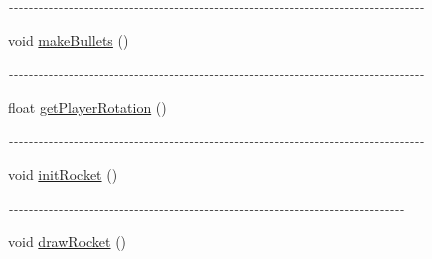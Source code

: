 \begin{DoxyCompactItemize}
\begin{DoxyCompactList}\small\item\em -\/-\/-\/-\/-\/-\/-\/-\/-\/-\/-\/-\/-\/-\/-\/-\/-\/-\/-\/-\/-\/-\/-\/-\/-\/-\/-\/-\/-\/-\/-\/-\/-\/-\/-\/-\/-\/-\/-\/-\/-\/-\/-\/-\/-\/-\/-\/-\/-\/-\/-\/-\/-\/-\/-\/-\/-\/-\/-\/-\/-\/-\/-\/-\/-\/-\/-\/-\/-\/-\/-\/-\/-\/-\/-\/-\/-\/-\/-\/-\/-\/-\/-\/ \item\end{DoxyCompactList}\item 
\hypertarget{classWorld_a5ca7c2b1e57adbecf26e52340687a6e6}{
void \hyperlink{classWorld_a5ca7c2b1e57adbecf26e52340687a6e6}{makeBullets} ()}
\label{classWorld_a5ca7c2b1e57adbecf26e52340687a6e6}

\begin{DoxyCompactList}\small\item\em -\/-\/-\/-\/-\/-\/-\/-\/-\/-\/-\/-\/-\/-\/-\/-\/-\/-\/-\/-\/-\/-\/-\/-\/-\/-\/-\/-\/-\/-\/-\/-\/-\/-\/-\/-\/-\/-\/-\/-\/-\/-\/-\/-\/-\/-\/-\/-\/-\/-\/-\/-\/-\/-\/-\/-\/-\/-\/-\/-\/-\/-\/-\/-\/-\/-\/-\/-\/-\/-\/-\/-\/-\/-\/-\/-\/-\/-\/-\/-\/-\/-\/-\/ \item\end{DoxyCompactList}\item 
\hypertarget{classWorld_a343c6d88fbb670b0d6585bfdc41299b1}{
float \hyperlink{classWorld_a343c6d88fbb670b0d6585bfdc41299b1}{getPlayerRotation} ()}
\label{classWorld_a343c6d88fbb670b0d6585bfdc41299b1}

\begin{DoxyCompactList}\small\item\em -\/-\/-\/-\/-\/-\/-\/-\/-\/-\/-\/-\/-\/-\/-\/-\/-\/-\/-\/-\/-\/-\/-\/-\/-\/-\/-\/-\/-\/-\/-\/-\/-\/-\/-\/-\/-\/-\/-\/-\/-\/-\/-\/-\/-\/-\/-\/-\/-\/-\/-\/-\/-\/-\/-\/-\/-\/-\/-\/-\/-\/-\/-\/-\/-\/-\/-\/-\/-\/-\/-\/-\/-\/-\/-\/-\/-\/-\/-\/-\/-\/-\/-\/ \item\end{DoxyCompactList}\item 
\hypertarget{classWorld_a78221e795cd003ded0770f62a351187d}{
void \hyperlink{classWorld_a78221e795cd003ded0770f62a351187d}{initRocket} ()}
\label{classWorld_a78221e795cd003ded0770f62a351187d}

\begin{DoxyCompactList}\small\item\em -\/-\/-\/-\/-\/-\/-\/-\/-\/-\/-\/-\/-\/-\/-\/-\/-\/-\/-\/-\/-\/-\/-\/-\/-\/-\/-\/-\/-\/-\/-\/-\/-\/-\/-\/-\/-\/-\/-\/-\/-\/-\/-\/-\/-\/-\/-\/-\/-\/-\/-\/-\/-\/-\/-\/-\/-\/-\/-\/-\/-\/-\/-\/-\/-\/-\/-\/-\/-\/-\/-\/-\/-\/-\/-\/-\/-\/-\/-\/ \item\end{DoxyCompactList}\item 
\hypertarget{classWorld_a5886c349d3dc4c9f3cdba8150812b8fd}{
void \hyperlink{classWorld_a5886c349d3dc4c9f3cdba8150812b8fd}{drawRocket} ()}
\label{classWorld_a5886c349d3dc4c9f3cdba8150812b8fd}


\end{DoxyCompactItemize}
